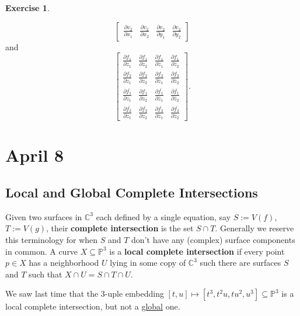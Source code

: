 \documentclass[12pt]{article}
\newcommand{\cx}{\mathbb{C}}
\newcommand{\p}{\mathbb{P}}
\theoremstyle{definition}
\newtheorem{exercise}{Exercise}
\theoremstyle{remark}
\begin{document}
\begin{exercise}
\begin{enumerate}[(a)]
\[\begin{bmatrix}
                \frac{\partial v_2}{\partial x_1} & \frac{\partial v_2}{\partial x_2} & \frac{\partial v_2}{\partial y_1} & \frac{\partial v_2}{\partial y_2} 
            \end{bmatrix}
        \]
        and 
        \[
            \begin{bmatrix}
                \frac{\partial f_1}{\partial z_1} & \frac{\partial f_1}{\partial z_2} & 
                \frac{\partial f_1}{\partial \overline{z}_1} &                 \frac{\partial f_1}{\partial \overline{z}_2} \\[0.5em]
                \frac{\partial f_2}{\partial z_1} & \frac{\partial f_2}{\partial z_2} & 
                \frac{\partial f_2}{\partial \overline{z}_1} &                 \frac{\partial f_2}{\partial \overline{z}_2} \\[0.5em]
                \frac{\partial \overline{f_1}}{\partial z_1} & \frac{\partial f_1}{\partial z_2} & 
                \frac{\partial \overline{f_1}}{\partial \overline{z}_1} &                 \frac{\partial \overline{f_1}}{\partial \overline{z}_2} \\[0.5em]
                \frac{\partial \overline{f_2}}{\partial z_1} & \frac{\partial \overline{f_2}}{\partial z_2} & 
                \frac{\partial \overline{f_2}}{\partial \overline{z}_1} &                 \frac{\partial \overline{f_2}}{\partial \overline{z}_2}
            \end{bmatrix}.
        \]
    \end{enumerate}
\end{exercise}
\section{April 8}
\subsection{Local and Global Complete Intersections}
Given two surfaces in $\cx^3$ each defined by a single equation, say $S := V(f)$, $T := V(g)$, their \textbf{complete intersection} is the set $S \cap T$. Generally we reserve this terminology for when $S$ and $T$ don't have any (complex) surface components in common. A curve $X \subseteq \p^3$ is a \textbf{local complete intersection} if every point $p \in X$ has a neighborhood $U$ lying in some copy of $\cx^3$ such there are surfaces $S$ and $T$ such that $X \cap U = S \cap T \cap U$.

We saw last time that the 3-uple embedding $[t,u] \mapsto [t^3,t^2u,tu^2,u^3] \subseteq \p^3$ is a local complete intersection, but not a \underline{global} one.
\end{document}
